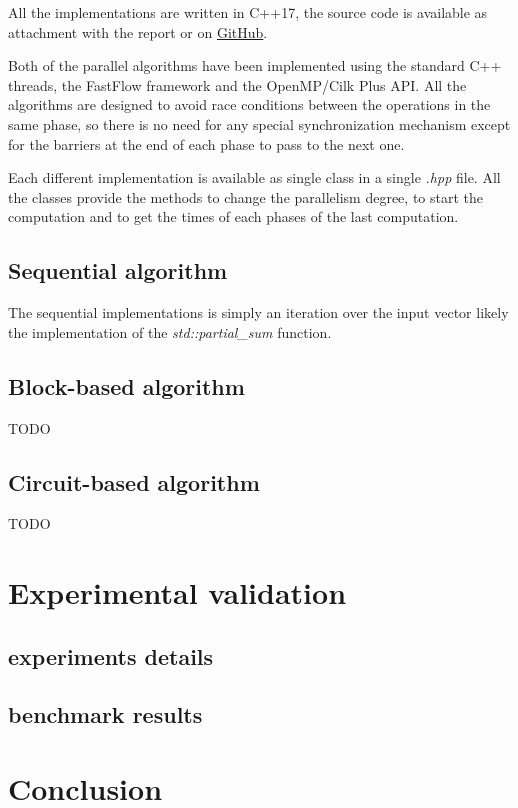 \documentclass{article}
\begin{document}
All the implementations are written in C++17, the source code is available as attachment with the report or on \href{https://github.com/GaspareG/ParallelPrefix}{GitHub}.

Both of the parallel algorithms have been implemented using the standard C++ threads, the FastFlow framework and the OpenMP/Cilk Plus API. All the algorithms are designed to avoid race conditions between the operations in the same phase, so there is no need for any special synchronization mechanism except for the barriers at the end of each phase to pass to the next one.

Each different implementation is available as single class in a single \textit{.hpp} file. All the classes provide the methods to change the parallelism degree, to start the computation and to get the times of each phases of the last computation.

\subsection{Sequential algorithm}

The sequential implementations is simply an iteration over the input vector likely the implementation of the \textit{std::partial\_sum} function.

\subsection{Block-based algorithm}

TODO

\subsection{Circuit-based algorithm}

TODO

\section{Experimental validation}


\subsection{experiments details}

\subsection{benchmark results}

\section{Conclusion}


\end{document}
